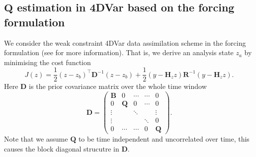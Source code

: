 \documentclass[a4paper,10pt]{article}
\numberwithin{equation}{section}
\begin{document}
\subsection{$\mathbf Q$ estimation in 4DVar based on the forcing formulation}
\label{sec:method}
We consider the weak constraint 4DVar data assimilation scheme in the forcing formulation (see \cite{book} for more information). That is, we derive an analysis state $z_a$ by minimising the cost function
\begin{equation}
\label{eqn:cost}
J(z)=\frac{1}{2}(z-z_b)^\top \mathbf D^{-1}(z-z_b)+\frac{1}{2}(y-\mathbf H_z z)\mathbf R^{-1}(y-\mathbf H_z z).
\end{equation}
Here  $\mathbf D$ is the prior covariance matrix over the whole time window
\begin{equation}
\mathbf D = 
\begin{pmatrix}
\mathbf B & 0 & \cdots  &\cdots & 0 \\
0 & \mathbf Q & 0 & \cdots & 0\\
\vdots & & \ddots && \vdots\\
\vdots & && \ddots & 0\\
0 & \cdots & \cdots & 0 & \mathbf Q
\end{pmatrix}.
\end{equation}
Note that we assume $\mathbf Q$ to be time independent and uncorrelated over time, this causes the block diagonal strucutre in $\mathbf D$. 
\end{document}

